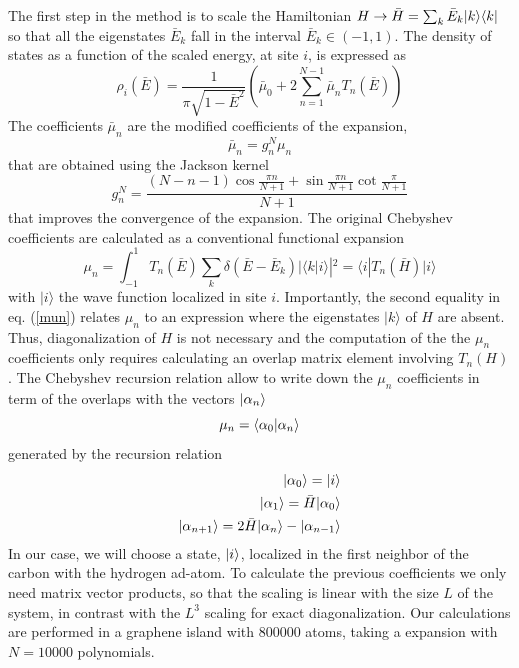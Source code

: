 The first step in the method is to  scale the Hamiltonian $H \rightarrow \bar H=\sum_k\bar E_k |k\rangle\langle k|$
so that all the eigenstates $\bar E_k$ fall in the interval $\bar E_k \in (-1,1)$.  The density of states as a function of the scaled energy, at site $i$,  is expressed as
\begin{equation}
\rho_i(\bar E) = \frac{1}{\pi \sqrt{1-\bar E^2}}
\left (\bar \mu_0 + 2 \sum^{N-1}_{n=1} \bar \mu_n T_n (\bar E)
\right )
\label{KPM}
\end{equation}
The coefficients $\bar \mu_n$ are
the modified coefficients of the expansion,
\begin{equation}
\bar \mu_n = g^N_n \mu_n
\end{equation}
that are obtained using the Jackson kernel\cite{Jackson1912}
\begin{equation}
g_n^N =
\frac{(N-n-1)\cos \frac{\pi n}{N+1} + \sin \frac{\pi n}{N+1}
\cot \frac{\pi }{N+1}}{N+1}
\end{equation}
that improves the convergence of the expansion. The original
Chebyshev coefficients are calculated as a conventional
functional expansion
\begin{equation}
\mu_n = \int_{-1}^{1} T_n(\bar E) \sum_k \delta (\bar E-\bar E_k) |\langle k | i \rangle |^2
= \langle i | T_n(\bar H) | i \rangle
\label{mun}
\end{equation}
with $| i \rangle$ the wave function localized in site $i$. Importantly, the second equality in eq. (\ref{mun}) relates $\mu_n$ to an expression where the eigenstates $|k\rangle$ of $H$ are absent. Thus, diagonalization of $H$ is not necessary and the computation of the the $\mu_n$ coefficients only requires calculating an overlap matrix element involving $T_n(H)$.
The Chebyshev recursion relation allow to write down the $\mu_n$ coefficients in term of the overlaps with the vectors
$|\alpha_n\rangle$
\begin{equation}
\mu_n =
\braket{\alpha_0}{\alpha_n}%
\end{equation}
generated by the recursion relation
\begin{equation}
\begin{aligned}
\ket{\alpha_0} = \ket{i}  \\  %
\ket{\alpha_1} = \bar{H} \ket{\alpha_0} \\
\ket{\alpha_{n+1}} = 2\bar{H} \ket{\alpha_n}- \ket{\alpha_{n-1}}
\end{aligned}
\end{equation}
In our case, we will choose a state, $|i\rangle$, localized in the first neighbor of the carbon with the hydrogen ad-atom.
To calculate the previous coefficients we only need matrix vector products, so that the scaling is linear with the size $L$ of the system, in contrast with the $L^3$ scaling for exact diagonalization.
Our calculations are performed in a graphene island with 800000 atoms, taking a expansion with $N=10000$ polynomials.


